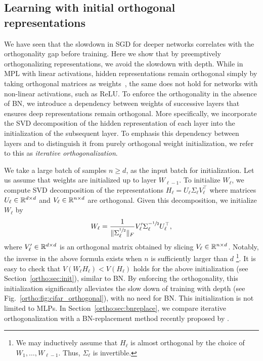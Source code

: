 \subsection{Learning with initial orthogonal representations}
We have seen that the slowdown in SGD for deeper networks correlates with the orthogonality gap before training.
Here we show that by preemptively orthogonalizing representations, we avoid the slowdown with depth. While in MPL with linear activations, hidden representations remain orthogonal simply by taking orthogonal matrices as weights~\citep{pennington2018emergence,saxe2013exact}, the same does not hold for networks with non-linear activations, such as ReLU. To enforce the orthogonality in the absence of BN, we introduce a dependency between weights of successive layers that ensures deep representations remain orthogonal. More specifically, we incorporate the SVD decomposition of the hidden representation of each layer into the initialization of the subsequent layer. To emphasis this dependency between layers and to distinguish it from purely orthogonal weight initialization, we refer to this as \emph{iterative orthogonalization}.

We take a large batch of samples $n\geq d$, as the input batch for initialization. Let us assume that weights are initialized up to layer $W_{\ell-1}$. To initialize $W_\ell$, we  compute SVD decomposition of the representations $H_\ell = U_\ell \Sigma_\ell V^\top_\ell$ where matrices $U_\ell \in \mathbb{R}^{d \times d}$ and $V_\ell \in \mathbb{R}^{n \times d}$ are orthogonal. Given this decomposition, we initialize $W_\ell$ by 
\begin{align} \label{ortho:eq:init_w}
    W_\ell = \frac{1}{\| \Sigma_\ell^{\sfrac{1}{2}}\|_F} V_\ell' \Sigma_\ell^{-\sfrac{1}{2}} U_\ell^\top,
\end{align}
where $V'_\ell \in \mathbb{R}^{d\times d}$ is an orthogonal matrix obtained by slicing $V_\ell \in \mathbb{R}^{n\times d}$. Notably, the inverse in the above formula exists when $n$ is sufficiently larger than $d$ \footnote{We may inductively assume that $H_\ell$ is almost orthogonal by the choice of $W_1, \dots, W_{\ell-1}$. Thus, $\Sigma_\ell$ is invertible. }. 
It is easy to check that  $V(W_\ell H_\ell)< V(H_\ell)$ holds for the above initialization (see Section~\ref{ortho:sec:init}), similar to BN. 
By enforcing the orthogonality, this initialization significantly alleviates the slow down of training with depth (see Fig.~\ref{ortho:fig:cifar_orthogonal}), with no need for BN. This initialization is not limited to MLPs. In Section~\ref{ortho:sec:bnreplace}, we compare iterative orthogonalization with a BN-replacement method recently proposed by \cite{brock2021high}.  

